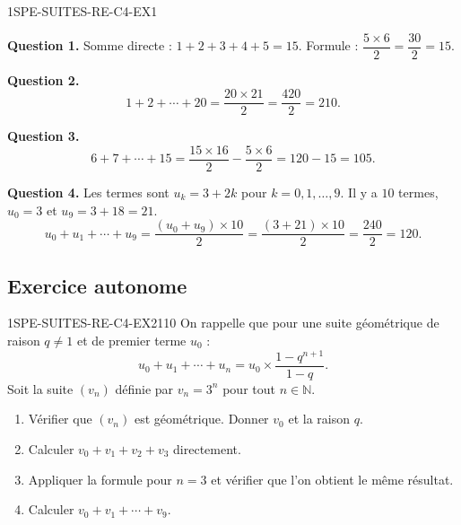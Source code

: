 
\begin{corrige}{1SPE-SUITES-RE-C4-EX1}


\textbf{Question 1.} Somme directe : $1+2+3+4+5 = 15$.
Formule : $\dfrac{5 \times 6}{2} = \dfrac{30}{2} = 15$. \checkmark

\textbf{Question 2.}
\[
1 + 2 + \cdots + 20 = \frac{20 \times 21}{2} = \frac{420}{2} = 210.
\]


\textbf{Question 3.}
\[
6 + 7 + \cdots + 15 = \frac{15 \times 16}{2} - \frac{5 \times 6}{2} = 120 - 15 = 105.
\]


\textbf{Question 4.} Les termes sont $u_k = 3 + 2k$ pour $k = 0, 1, \ldots, 9$. Il y a $10$ termes, $u_0 = 3$ et $u_9 = 3 + 18 = 21$.
\[
u_0 + u_1 + \cdots + u_9 = \frac{(u_0 + u_9) \times 10}{2} = \frac{(3 + 21) \times 10}{2} = \frac{240}{2} = 120.
\]

\end{corrige}

\subsection*{Exercice autonome}


\begin{exercice}{1SPE-SUITES-RE-C4-EX2}{1}{10}
On rappelle que pour une suite géométrique de raison $q
\neq 1$ et de premier terme $u_0$ :
\[
u_0 + u_1 + \cdots + u_n = u_0 \times \frac{1 - q^{n+1}}{1 - q}.
\]
Soit la suite $(v_n)$ définie par $v_n = 3^n$ pour tout $n \in \mathbb{N}$.
\begin{enumerate}
  \item Vérifier que $(v_n)$ est géométrique. Donner $v_0$ et la raison $q$.
  \item Calculer $v_0 + v_1 + v_2 + v_3$ directement.
  \item Appliquer la formule pour $n = 3$ et vérifier que l'on obtient le même résultat.
  \item Calculer $v_0 + v_1 + \cdots + v_9$.
\end{enumerate}
\end{exercice}

